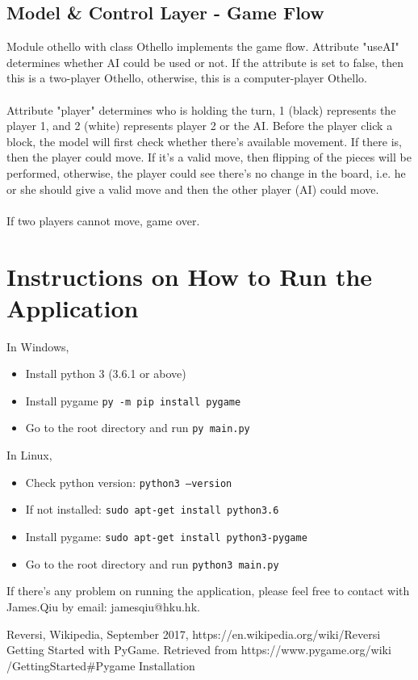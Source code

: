 \documentclass[letterpaper,12pt]{article}
\begin{document}
\subsection{Model \& Control Layer - Game Flow}
Module othello with class Othello implements the game flow. Attribute "useAI" determines whether AI could be used or not. If the attribute is set to false, then this is a two-player Othello, otherwise, this is a computer-player Othello.\\\\
\noindent
Attribute "player" determines who is holding the turn, 1 (black) represents the player 1, and 2 (white) represents player 2 or the AI. Before the player click a block, the model will first check whether there's available movement. If there is, then the player could move. If it's a valid move, then flipping of the pieces will be performed, otherwise, the player could see there's no change in the board, i.e. he or she should give a valid move and then the other player (AI) could move.\\\\
\noindent
If two players cannot move, game over.

\section{Instructions on How to Run the Application}

In Windows,

\begin{itemize}
\item Install python 3 (3.6.1 or above)
\item Install pygame \texttt{py -m pip install pygame}
\item Go to the root directory and run \texttt{py main.py}
\end{itemize}

\noindent
In Linux,

\begin{itemize}
\item Check python version: \texttt{python3 --version}
\item If not installed: \texttt{sudo apt-get install python3.6}
\item Install pygame: \texttt{sudo apt-get install python3-pygame}
\item Go to the root directory and run \texttt{python3 main.py}
\end{itemize}

\noindent
If there's any problem on running the application, please feel free to contact with James.Qiu by email: jamesqiu@hku.hk.


\begin{thebibliography}{}
\bibitem{}
Reversi, Wikipedia, September 2017, https://en.wikipedia.org/wiki/Reversi
\bibitem{}
Getting Started with PyGame. Retrieved from https://www.pygame.org/wiki /GettingStarted\#Pygame Installation
\end{thebibliography}
\end{document}
